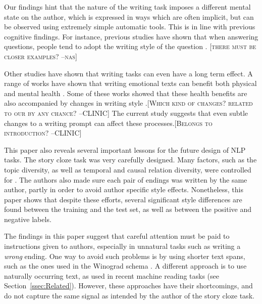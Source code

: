 \documentclass[11pt,a4paper]{article}
\newcommand{\secref}[1]{Section~\ref{ssec:#1}}
\newcommand{\resolved}[1]{}
\newcommand{\nascomment}[1]{{\color{blue}\textsc{[#1 --nas]}}}
\newcommand{\clinic}[1]{{\color{magenta}\textsc{[#1 --CLINIC]}}}
\begin{document}
Our findings hint that the nature of the writing task imposes a
different mental state on the author, which is expressed in ways which
are often implicit, but can be observed using extremely simple automatic tools. 
This is in line with previous cognitive findings. 
For instance, previous studies have shown that when answering questions, people  tend to adopt the writing style of the question \cite{Ireland:2010}.
\nascomment{there must be closer examples?}

Other studies have shown that writing tasks can even have a long term effect.
A range of works have shown that writing emotional texts can benefit both physical and mental health \cite{Lepore:2002,Frattaroli:2006}. 
Some of these works showed that these health benefits  \resolved{\nascomment{what are
  ``these changes''?}} are also accompanied by changes in writing style
\cite{Campbell:2003}.\clinic{Which kind of changes? related to our by any chance?} The current study suggests that even subtle
changes to a writing prompt can affect these processes.\clinic{Belongs to introduction?}


This paper also reveals several important lessons for the future
design of NLP tasks. 
The story cloze task was very carefully designed. Many factors, such as the topic diversity, as well as  temporal and causal relation diversity,  were controlled for \cite{Mostafazadeh:2016}. 
The authors also made sure each pair of endings was written by the same author, partly in order to avoid author specific style effects.
 Nonetheless, this paper shows that despite these efforts, several significant style differences are found between the training and the test set, as well as between the positive and negative labels. 
 
The findings in this paper suggest that careful attention must be paid to instructions given to authors, especially in unnatural tasks such as writing a {\it wrong} ending. 
One way to avoid such problems is by using shorter text spans, such as the ones used in the Winograd schema \cite{Levesque:2011}.
A different approach is to use naturally occurring text, as used in recent machine reading tasks (see \secref{Related}). 
However,  these approaches have their shortcomings, and do not capture the same signal as intended by the author of the story cloze task.
\end{document}
